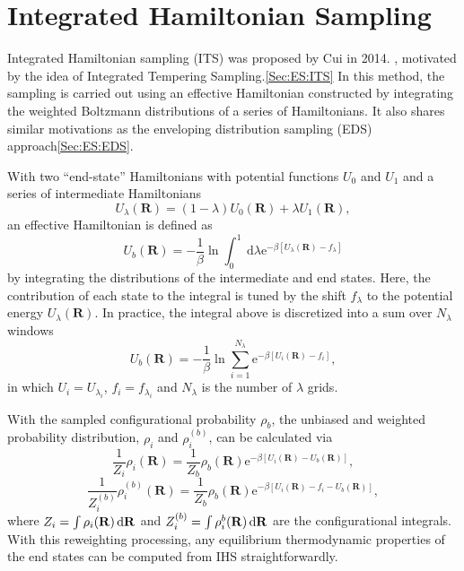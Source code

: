 \section{Integrated Hamiltonian Sampling\label{Sec:ES:IHS}}
Integrated Hamiltonian sampling (ITS) was proposed by Cui in 2014.\cite{MoriJPCB2014} , motivated by the idea of Integrated Tempering Sampling.\ref{Sec:ES:ITS} In this method, the sampling is carried out using an effective Hamiltonian constructed by integrating the weighted Boltzmann distributions of a series of Hamiltonians. It also shares similar motivations as the enveloping distribution sampling (EDS) approach\ref{Sec:ES:EDS}.

With two ``end-state'' Hamiltonians with potential functions $U_0$ and $U_1$ and a series of intermediate Hamiltonians
\begin{equation}
	U_{\lambda}(\mathbf{R})=(1-\lambda)U_0(\mathbf{R})+\lambda U_1(\mathbf{R}),
\end{equation}
an effective Hamiltonian is defined as
\begin{equation}
    U_b(\mathbf{R})=-\frac{1}{\beta} \ln \int_0^1 \mathrm{~d} \lambda \mathrm{e}^{-\beta \left[U_\lambda(\mathbf{R})-f_\lambda\right]}
\end{equation}
by integrating the distributions of the intermediate and end states. 
Here, the contribution of each state to the integral is tuned by the shift $f_\lambda$ to the potential energy $U_\lambda(\mathbf{R})$. 
In practice, the integral above is discretized into a sum over
$N_{\lambda}$ windows
\begin{equation}
	U_b(\mathbf{R})=-\frac{1}{\beta} \ln \sum_{i=1}^{N_\lambda} \mathrm{e}^{-\beta \left[U_i(\mathbf{R})-f_i\right]},
\end{equation}
in which $U_i=U_{\lambda_i}$, 
$f_i=f_{\lambda_i}$
and $N_\lambda$ is the number of $\lambda$ grids. 

With the sampled configurational probability $\rho_b$, the unbiased and weighted probability distribution, $\rho_i$  and $\rho_i^{(b)}$, can be calculated via
\begin{equation}
	\frac{1}{Z_i} \rho_i(\mathbf{R})=\frac{1}{Z_b} \rho_b(\mathbf{R}) \mathrm{e}^{-\beta\left[U_i(\mathbf{R})-U_b(\mathbf{R})\right]},
\end{equation}
\begin{equation}
	\frac{1}{Z_i^{(b)}} \rho_i^{(b)}(\mathbf{R})=\frac{1}{Z_b} \rho_b(\mathbf{R}) \mathrm{e}^{-\beta\left[U_i(\mathbf{R})-f_i-U_b(\mathbf{R})\right]},
\end{equation}
where $Z_i=\int \rho_i(\mathbf{R})\mathop{}\!\mathrm{d} \mathbf{R}$ and $Z_i^{(b)}=\int \rho_i^{b}(\mathbf{R})\mathop{}\!\mathrm{d} \mathbf{R}$ are the configurational integrals. With this reweighting processing, any equilibrium thermodynamic properties of the end states can be computed from IHS straightforwardly.

